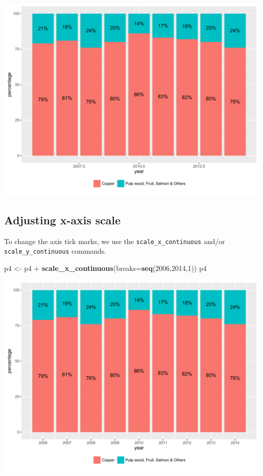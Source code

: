 \documentclass[]{article}
\newenvironment{Shaded}{\begin{snugshade}}{\end{snugshade}}
\newcommand{\KeywordTok}[1]{\textcolor[rgb]{0.13,0.29,0.53}{\textbf{{#1}}}}
\newcommand{\DataTypeTok}[1]{\textcolor[rgb]{0.13,0.29,0.53}{{#1}}}
\newcommand{\DecValTok}[1]{\textcolor[rgb]{0.00,0.00,0.81}{{#1}}}
\newcommand{\StringTok}[1]{\textcolor[rgb]{0.31,0.60,0.02}{{#1}}}
\newcommand{\NormalTok}[1]{{#1}}
\begin{document}
\begin{center}\includegraphics{0_all_posts_pdf/stacked_5-1} \end{center}

\subsection{Adjusting x-axis scale}\label{adjusting-x-axis-scale-3}

To change the axis tick marks, we use the \texttt{scale\_x\_continuous}
and/or \texttt{scale\_y\_continuous} commands.

\begin{Shaded}
\begin{Highlighting}[]
\NormalTok{p4 <-}\StringTok{ }\NormalTok{p4 +}\StringTok{ }\KeywordTok{scale_x_continuous}\NormalTok{(}\DataTypeTok{breaks=}\KeywordTok{seq}\NormalTok{(}\DecValTok{2006}\NormalTok{,}\DecValTok{2014}\NormalTok{,}\DecValTok{1}\NormalTok{))}
\NormalTok{p4}
\end{Highlighting}
\end{Shaded}

\begin{center}\includegraphics{0_all_posts_pdf/stacked_6-1} \end{center}
\end{document}
